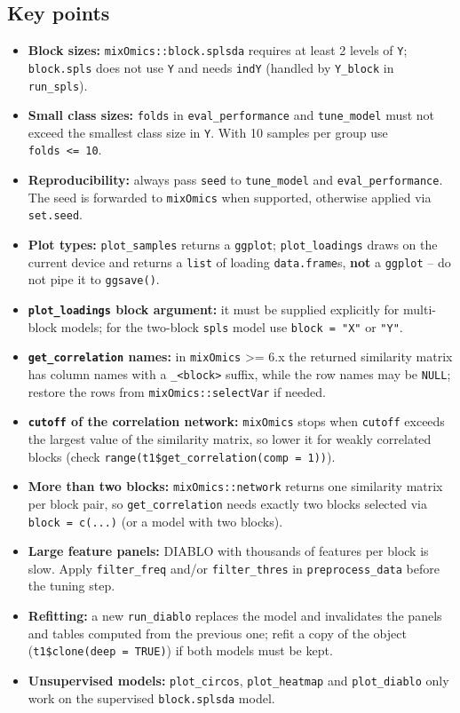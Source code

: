 \documentclass[
]{book}
\providecommand{\tightlist}{%
  \setlength{\itemsep}{0pt}\setlength{\parskip}{0pt}}
\begin{document}
\subsection{Key points}\label{key-points-12}

\begin{itemize}
\tightlist
\item
  \textbf{Block sizes:} \texttt{mixOmics::block.splsda} requires at least 2 levels of \texttt{Y}; \texttt{block.spls} does not use \texttt{Y} and needs \texttt{indY} (handled by \texttt{Y\_block} in \texttt{run\_spls}).
\item
  \textbf{Small class sizes:} \texttt{folds} in \texttt{eval\_performance} and \texttt{tune\_model} must not exceed the smallest class size in \texttt{Y}.
  With 10 samples per group use \texttt{folds\ \textless{}=\ 10}.
\item
  \textbf{Reproducibility:} always pass \texttt{seed} to \texttt{tune\_model} and \texttt{eval\_performance}.
  The seed is forwarded to \texttt{mixOmics} when supported, otherwise applied via \texttt{set.seed}.
\item
  \textbf{Plot types:} \texttt{plot\_samples} returns a \texttt{ggplot}; \texttt{plot\_loadings} draws on the current device and returns a \texttt{list} of loading \texttt{data.frame}s, \textbf{not} a \texttt{ggplot} -- do not pipe it to \texttt{ggsave()}.
\item
  \textbf{\texttt{plot\_loadings} block argument:} it must be supplied explicitly for multi-block models; for the two-block \texttt{spls} model use \texttt{block\ =\ "X"} or \texttt{"Y"}.
\item
  \textbf{\texttt{get\_correlation} names:} in \texttt{mixOmics} \textgreater= 6.x the returned similarity matrix has column names with a \texttt{\_\textless{}block\textgreater{}} suffix, while the row names may be \texttt{NULL}; restore the rows from \texttt{mixOmics::selectVar} if needed.
\item
  \textbf{\texttt{cutoff} of the correlation network:} \texttt{mixOmics} stops when \texttt{cutoff} exceeds the largest value of the similarity matrix, so lower it for weakly correlated blocks (check \texttt{range(t1\$get\_correlation(comp\ =\ 1))}).
\item
  \textbf{More than two blocks:} \texttt{mixOmics::network} returns one similarity matrix per block pair, so \texttt{get\_correlation} needs exactly two blocks selected via \texttt{block\ =\ c(...)} (or a model with two blocks).
\item
  \textbf{Large feature panels:} DIABLO with thousands of features per block is slow.
  Apply \texttt{filter\_freq} and/or \texttt{filter\_thres} in \texttt{preprocess\_data} before the tuning step.
\item
  \textbf{Refitting:} a new \texttt{run\_diablo} replaces the model and invalidates the panels and tables computed from the previous one; refit a copy of the object (\texttt{t1\$clone(deep\ =\ TRUE)}) if both models must be kept.
\item
  \textbf{Unsupervised models:} \texttt{plot\_circos}, \texttt{plot\_heatmap} and \texttt{plot\_diablo} only work on the supervised \texttt{block.splsda} model.
\end{itemize}
\end{document}
